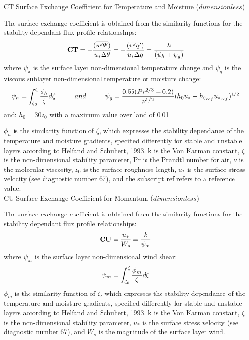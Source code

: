 \noindent
{ \underline {CT}  Surface Exchange Coefficient for Temperature and Moisture ($dimensionless$) }

\noindent
The surface exchange coefficient is obtained from the similarity functions for the stability
 dependant flux profile relationships:
\[
{\bf CT} = -{( {\overline{w^{\prime}\theta^{\prime}}}) \over {u_* \Delta \theta }} = 
-{( {\overline{w^{\prime}q^{\prime}}}) \over {u_* \Delta q }} = 
{ k \over { (\psi_{h} + \psi_{g}) } } 
\]
where $\psi_h$ is the surface layer non-dimensional temperature change and $\psi_g$ is the
viscous sublayer non-dimensional temperature or moisture change:
\[
\psi_{h} = {\int_{\zeta_{0}}^{\zeta} {\phi_{h} \over \zeta} d \zeta} \hspace{1cm} and 
\hspace{1cm} \psi_{g} = { 0.55 (Pr^{2/3} - 0.2) \over \nu^{1/2} } 
(h_{0}u_{*} - h_{0_{ref}}u_{*_{ref}})^{1/2}
\]
and:
$h_{0} = 30z_{0}$ with a maximum value over land of 0.01

\noindent
$\phi_h$ is the similarity function of $\zeta$, which expresses the stability dependance of
the temperature and moisture gradients, specified differently for stable and unstable 
layers according to Helfand and Schubert, 1993. k is the Von Karman constant, $\zeta$ is the 
non-dimensional stability parameter, Pr is the Prandtl number for air, $\nu$ is the molecular 
viscosity, $z_{0}$ is the surface roughness length, $u_*$ is the surface stress velocity 
(see diagnostic number 67), and the subscript ref refers to a reference value.
\\

\noindent
{ \underline {CU}  Surface Exchange Coefficient for Momentum ($dimensionless$) }

\noindent
The surface exchange coefficient is obtained from the similarity functions for the stability
 dependant flux profile relationships:
\[
{\bf CU} = {u_* \over W_s} = { k \over \psi_{m} } 
\]
where $\psi_m$ is the surface layer non-dimensional wind shear: 
\[
\psi_{m} = {\int_{\zeta_{0}}^{\zeta} {\phi_{m} \over \zeta} d \zeta}
\]
\noindent
$\phi_m$ is the similarity function of $\zeta$, which expresses the stability dependance of
the temperature and moisture gradients, specified differently for stable and unstable layers
according to Helfand and Schubert, 1993. k is the Von Karman constant, $\zeta$ is the 
non-dimensional stability parameter, $u_*$ is the surface stress velocity 
(see diagnostic number 67), and $W_s$ is the magnitude of the surface layer wind.
\\

